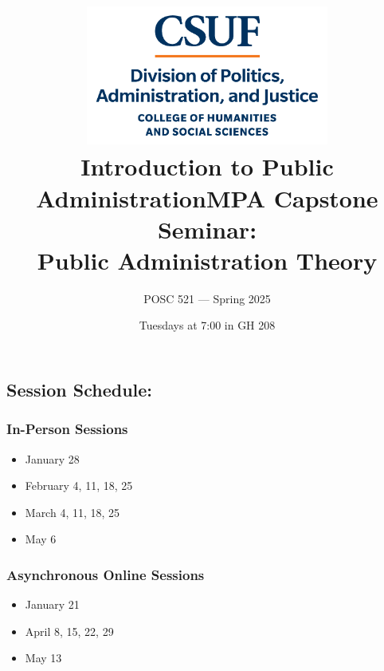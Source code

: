 \documentclass[11pt, letterpaper]{article}
\begin{document}
\title{\includegraphics[width=8cm]{Images/stacked.png} \\ \textbf{Introduction to Public Administration}}

\title{MPA Capstone Seminar: \\ Public Administration Theory}
\author{POSC 521 — Spring 2025}
\date{Tuesdays at 7:00 in GH 208}
    \maketitle
        \subsection*{Session Schedule:}
                    
                    \begin{multicols}{2}
                    \subsubsection*{In-Person Sessions}
                    \begin{itemize}[leftmargin=*]
                        \item January 28
                        \item February 4, 11, 18, 25
                        \item March 4, 11, 18, 25
                        \item May 6
                    \end{itemize}
                    
                    \columnbreak
                    
                    \subsubsection*{Asynchronous Online Sessions}
                    \begin{itemize}[leftmargin=*]
                        \item January 21
                        \item April 8, 15, 22, 29
                        \item May 13
                    \end{itemize}
                    \end{multicols}
\end{document}
